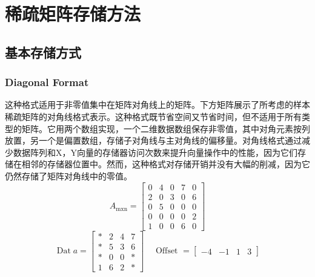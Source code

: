 \documentclass[forprint]{WHUBachelor}
\begin{document}
\chapter{稀疏矩阵存储方法}
\section{基本存储方式}
\subsection{Diagonal Format}
这种格式适用于非零值集中在矩阵对角线上的矩阵\cite{Bell:SpMV:NVIDIA:2008}。下方矩阵展示了所考虑的样本稀疏矩阵的对角线格式表示。这种格式既节省空间又节省时间，但不适用于所有类型的矩阵。它用两个数组实现，一个二维数据数组保存非零值，其中对角元素按列放置，另一个是偏置数组，存储子对角线与主对角线的偏移量。对角线格式通过减少数据阵列和X，Y向量的存储器访问次数来提升向量操作中的性能，因为它们存储在相邻的存储器位置中。然而，这种格式对存储开销并没有大幅的削减，因为它仍然存储了矩阵对角线中的零值。
\begin{equation} 
A_{\operatorname{mxn}}=\left[ \begin{array}{ccccc}{0} & {4} & {0} & {7} & {0} \\ {2} & {0} & {3} & {0} & {6} \\ {0} & {5} & {0} & {0} & {0} \\ {0} & {0} & {0} & {0} & {2} \\ {1} & {0} & {0} & {6} & {0}\end{array}\right]
 \end{equation}
\begin {equation} 
\operatorname{Dat} a=\left[ \begin{array}{cccc}{*} & {2} & {4} & {7} \\ {*} & {5} & {3} & {6} \\ {*} & {0} & {0} & {*} \\ {1} & {6} & {2} & {*}\end{array}\right] \quad \text { Offset }=\left[ \begin{array}{ccccc}{-4} & {-1} & {1} & {3}\end{array}\right]
 \end {equation}
\end{document}
